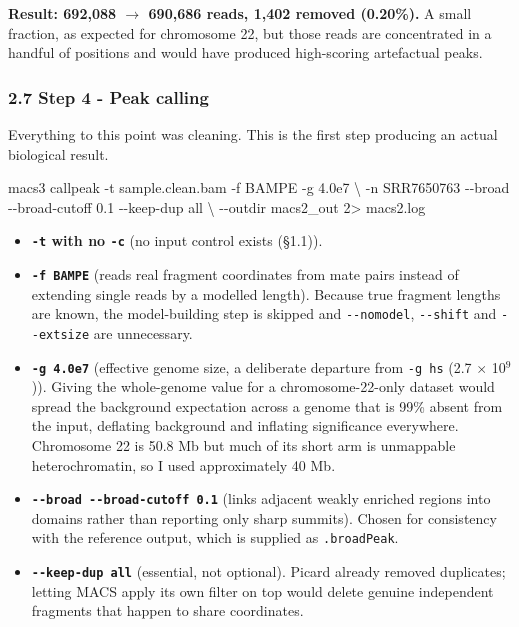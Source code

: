 \documentclass[
  11pt,
  a4paper,
]{article}
\newenvironment{Shaded}{}{}
\newcommand{\AttributeTok}[1]{\textcolor[rgb]{0.49,0.56,0.16}{#1}}
\newcommand{\DataTypeTok}[1]{\textcolor[rgb]{0.56,0.13,0.00}{#1}}
\newcommand{\DecValTok}[1]{\textcolor[rgb]{0.25,0.63,0.44}{#1}}
\newcommand{\ExtensionTok}[1]{#1}
\newcommand{\NormalTok}[1]{#1}
\newcommand{\OperatorTok}[1]{\textcolor[rgb]{0.40,0.40,0.40}{#1}}
\providecommand{\tightlist}{%
  \setlength{\itemsep}{0pt}\setlength{\parskip}{0pt}}
\begin{document}
\textbf{Result: 692,088 \(\rightarrow\) 690,686 reads, 1,402 removed
(0.20\%).} A small fraction, as expected for chromosome 22, but those
reads are concentrated in a handful of positions and would have produced
high-scoring artefactual peaks.

\hypertarget{step-4---peak-calling}{%
\subsubsection{2.7 Step 4 - Peak calling}\label{step-4---peak-calling}}

Everything to this point was cleaning. This is the first step producing
an actual biological result.

\begin{Shaded}
\begin{Highlighting}[]
\ExtensionTok{macs3}\NormalTok{ callpeak }\AttributeTok{{-}t}\NormalTok{ sample.clean.bam }\AttributeTok{{-}f}\NormalTok{ BAMPE }\AttributeTok{{-}g}\NormalTok{ 4.0e7 }\DataTypeTok{\textbackslash{}}
  \AttributeTok{{-}n}\NormalTok{ SRR7650763 }\AttributeTok{{-}{-}broad} \AttributeTok{{-}{-}broad{-}cutoff}\NormalTok{ 0.1 }\AttributeTok{{-}{-}keep{-}dup}\NormalTok{ all }\DataTypeTok{\textbackslash{}}
  \AttributeTok{{-}{-}outdir}\NormalTok{ macs2\_out }\DecValTok{2}\OperatorTok{\textgreater{}}\NormalTok{ macs2.log}
\end{Highlighting}
\end{Shaded}

\begin{itemize}
\tightlist
\item
  \textbf{\texttt{-t} with no \texttt{-c}} (no input control exists
  (§1.1)).
\item
  \textbf{\texttt{-f\ BAMPE}} (reads real fragment coordinates from mate
  pairs instead of extending single reads by a modelled length). Because
  true fragment lengths are known, the model-building step is skipped
  and \texttt{-\/-nomodel}, \texttt{-\/-shift} and \texttt{-\/-extsize}
  are unnecessary.
\item
  \textbf{\texttt{-g\ 4.0e7}} (effective genome size, a deliberate
  departure from \texttt{-g\ hs} (2.7 \(\times\) 10\(^{9}\))). Giving
  the whole-genome value for a chromosome-22-only dataset would spread
  the background expectation across a genome that is 99\% absent from
  the input, deflating background and inflating significance everywhere.
  Chromosome 22 is 50.8 Mb but much of its short arm is unmappable
  heterochromatin, so I used approximately 40 Mb.
\item
  \textbf{\texttt{-\/-broad\ -\/-broad-cutoff\ 0.1}} (links adjacent
  weakly enriched regions into domains rather than reporting only sharp
  summits). Chosen for consistency with the reference output, which is
  supplied as \texttt{.broadPeak}.
\item
  \textbf{\texttt{-\/-keep-dup\ all}} (essential, not optional). Picard
  already removed duplicates; letting MACS apply its own filter on top
  would delete genuine independent fragments that happen to share
  coordinates.
\end{itemize}
\end{document}
